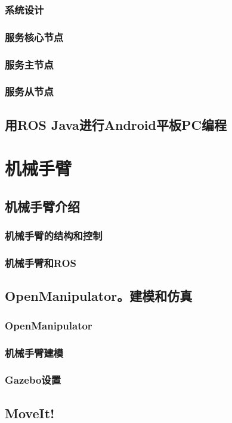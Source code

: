 \documentclass[geye,green,kindle,cn]{elegantnote}
\begin{document}
\subsubsection{系统设计}
\subsubsection{服务核心节点}
\subsubsection{服务主节点}
\subsubsection{服务从节点}
\subsection{用ROS Java进行Android平板PC编程}
\section{机械手臂}
\subsection{机械手臂介绍}
\subsubsection{机械手臂的结构和控制}
\subsubsection{机械手臂和ROS}
\subsection{OpenManipulator。建模和仿真}
\subsubsection{OpenManipulator}
\subsubsection{机械手臂建模}
\subsubsection{Gazebo设置}
\subsection{MoveIt!}
\end{document}
